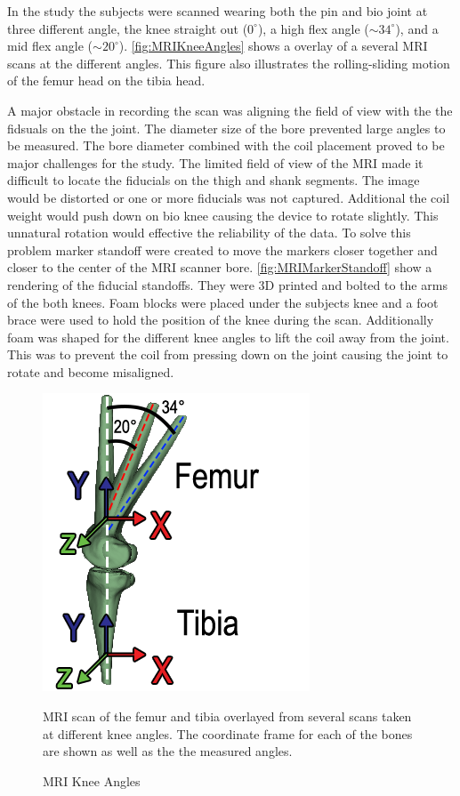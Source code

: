 In the study the subjects were scanned wearing both the pin and bio joint at three different angle, the knee straight out ($0^{\circ}$), a high flex angle ($\sim34^{\circ}$),  and a mid flex angle  ($\sim20^{\circ}$). \autoref{fig:MRIKneeAngles} shows a overlay of a several MRI scans at the different angles. This figure also illustrates the rolling-sliding motion of the femur head on the tibia head. 

A major obstacle in recording the scan was aligning the field of view with the the fidsuals on the the joint. The diameter size of the bore prevented large angles to be measured. The bore diameter combined with the coil placement proved to be major challenges for the study. The limited field of view of the MRI made it difficult to locate the fiducials on the thigh and shank segments. The image would be distorted or one or more fiducials was not captured. Additional the coil weight would push down on bio knee causing the device to rotate slightly. This unnatural rotation would effective the reliability of the data. To solve this problem marker standoff were created to move the markers closer together and closer to the center of the MRI scanner bore. \autoref{fig:MRIMarkerStandoff} show a rendering of the fiducial standoffs. They were 3D printed and bolted to the arms of the both knees. Foam blocks were placed under the subjects knee and a foot brace were used to hold the position of the knee during the scan. Additionally foam was shaped for the different knee angles to lift the coil away from the joint. This was to prevent the coil from pressing down on the joint causing the joint to rotate and become misaligned. 


\begin{figure}
    \centering
    \includegraphics{images/mech_design/mri_knee_angles.png}
    \caption{MRI Knee Angles}{MRI scan of the femur and tibia overlayed from several scans taken at different knee angles. The coordinate frame for each of the bones are shown as well as the the measured angles.}
    \label{fig:MRIKneeAngles}
\end{figure}


